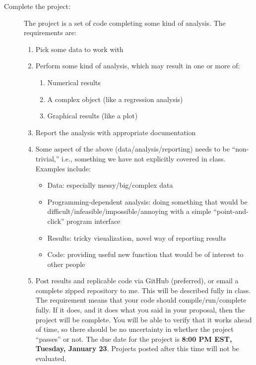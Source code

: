 \documentclass[11pt]{tufte-handout}
\begin{document}
\begin{description}
\item[{Complete the project:}] The project is a set of code completing some kind of analysis. The requirements are:
\begin{enumerate}
\item Pick some data to work with
\item Perform some kind of analysis, which may result in one or more of:
\begin{enumerate}
\item Numerical results
\item A complex object (like a regression analysis)
\item Graphical results (like a plot)
\end{enumerate}
\item Report the analysis with appropriate documentation
\item Some aspect of the above (data/analysis/reporting) needs to be ``non-trivial,'' i.e., something we have not explicitly covered in class.  Examples include:
\begin{itemize}
\item Data: especially messy/big/complex data 
\item Programming-dependent analysis: doing something that would be difficult/infeasible/impossible/annoying with a simple ``point-and-click'' program interface 
\item Results: tricky visualization, novel way of reporting results 
\item Code: providing useful new function that would be of interest to other people 
\end{itemize}
\item Post results and replicable code via GitHub (preferred), or email a complete zipped repository to me. This will be described fully in class. The requirement means that your code should compile/run/complete fully. If it does, and it does what you said in your proposal, then the project will be complete.  You will be able to verify that it works ahead of time, so there should be no uncertainty in whether the project ``passes'' or not. The due date  for the project is \textbf{8:00 PM EST, Tuesday, January 23}. Projects posted after this time will not be evaluated.
\end{enumerate}
\end{description}
\end{document}
